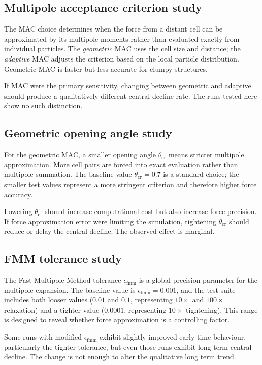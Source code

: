 \subsection{Multipole acceptance criterion study}

The MAC choice determines when the force from a distant cell can be approximated by its multipole moments rather than evaluated exactly from individual particles. The \textit{geometric} MAC uses the cell size and distance; the \textit{adaptive} MAC adjusts the criterion based on the local particle distribution. Geometric MAC is faster but less accurate for clumpy structures.

If MAC were the primary sensitivity, changing between geometric and adaptive should produce a qualitatively different central decline rate. The runs tested here show no such distinction.

\subsection{Geometric opening angle study}

For the geometric MAC, a smaller opening angle $\theta_{\mathrm{cr}}$ means stricter multipole approximation. More cell pairs are forced into exact evaluation rather than multipole summation. The baseline value $\theta_{\mathrm{cr}} = 0.7$ is a standard choice; the smaller test values represent a more stringent criterion and therefore higher force accuracy.

Lowering $\theta_{\mathrm{cr}}$ should increase computational cost but also increase force precision. If force approximation error were limiting the simulation, tightening $\theta_{\mathrm{cr}}$ should reduce or delay the central decline. The observed effect is marginal.

\subsection{FMM tolerance study}

The Fast Multipole Method tolerance $\epsilon_{\mathrm{fmm}}$ is a global precision parameter for the multipole expansion. The baseline value is $\epsilon_{\mathrm{fmm}} = 0.001$, and the test suite includes both looser values ($0.01$ and $0.1$, representing $10\times$ and $100\times$ relaxation) and a tighter value ($0.0001$, representing $10\times$ tightening). This range is designed to reveal whether force approximation is a controlling factor.

Some runs with modified $\epsilon_{\mathrm{fmm}}$ exhibit slightly improved early time behaviour, particularly the tighter tolerance, but even those runs exhibit long term central decline. The change is not enough to alter the qualitative long term trend.

